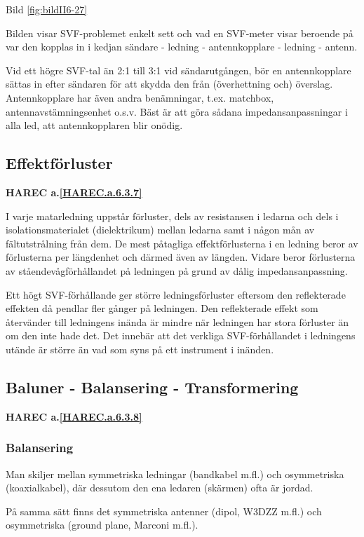 Bild \ref{fig:bildII6-27}

Bilden visar SVF-problemet enkelt sett och vad en SVF-meter visar
beroende på var den kopplas in i kedjan sändare - ledning -
antennkopplare - ledning - antenn.

Vid ett högre SVF-tal än 2:1 till 3:1 vid sändarutgången, bör en
antennkopplare sättas in efter sändaren för att skydda den från
(överhettning och) överslag. Antennkopplare har även andra
benämningar, t.ex. matchbox, antennavstämningsenhet o.s.v. Bäst är att
göra sådana impedansanpassningar i alla led, att antennkopplaren blir
onödig.

\subsection{Effektförluster}
\textbf{
HAREC a.\ref{HAREC.a.6.3.7}\label{myHAREC.a.6.3.7}
}

I varje matarledning uppstår förluster, dels av resistansen i ledarna
och dels i isolationsmaterialet (dielektrikum) mellan ledarna samt i
någon mån av fältutstrålning från dem. De mest påtagliga
effektförlusterna i en ledning beror av förlusterna per längdenhet och
därmed även av längden. Vidare beror förlusterna av
ståendevågförhållandet på ledningen på grund av dålig
impedansanpassning.

Ett högt SVF-förhållande ger större ledningsförluster eftersom den
reflekterade effekten då pendlar fler gånger på ledningen.  Den
reflekterade effekt som återvänder till ledningens inända är mindre
när ledningen har stora förluster än om den inte hade det.  Det
innebär att det verkliga SVF-förhållandet i ledningens utände är
större än vad som syns på ett instrument i inänden.

\subsection{Baluner - Balansering - Transformering}
\textbf{
HAREC a.\ref{HAREC.a.6.3.8}\label{myHAREC.a.6.3.8}
}

\subsubsection{Balansering}

Man skiljer mellan symmetriska ledningar (bandkabel m.fl.) och
osymmetriska (koaxialkabel), där dessutom den ena ledaren (skärmen)
ofta är jordad.

På samma sätt finns det symmetriska antenner (dipol, W3DZZ m.fl.) och
osymmetriska (ground plane, Marconi m.fl.).

